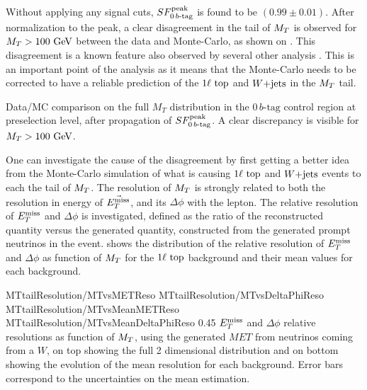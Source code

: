     Without applying any signal cuts, $SF_{0\, b\text{-tag}}^{\text{peak}}$ is found to be $(0.99 \pm 0.01)$.
    After normalization to the peak, a clear disagreement in the tail of $M_T$ is observed
    for $M_T > 100 ~\text{GeV}$ between the data and Monte-Carlo, as shown on
    . This disagreement is a known feature
    also observed by several other analysis \cite{WjetsDifferentialCrossSection, LeptonicMonotop,
    B2GttMET}. This is an important point of the analysis as
    it means that the Monte-Carlo needs to be corrected to have a reliable prediction of
    the $1\ell~\text{top}$ and $\text{$W$+jets}$ in the $M_T$ tail.

                 {Data/MC comparison on the full $M_T$ distribution in the $0\, b\text{-tag}$ control
                 region at preselection level, after propagation of $SF_{0\, b\text{-tag}}^{\text{peak}}$. A clear
                 discrepancy is visible for $M_T > 100 ~\text{GeV}$.}

    One can investigate the cause of the disagreement by first getting a better idea from
    the Monte-Carlo simulation of what is causing $1\ell~\text{top}$ and $\text{$W$+jets}$ events
    to each the tail of $M_T$. The resolution of $M_T$ is strongly related to both the
    resolution in energy of $\vec{E_T^\text{miss}}$, and its $\Delta\phi$ with the lepton. The relative
    resolution of $E_T^\text{miss}$ and $\Delta \phi$ is investigated, defined as the ratio of the
    reconstructed quantity versus the generated quantity, constructed from the generated
    prompt neutrinos in the event.  shows the distribution of the relative
    resolution of $E_T^\text{miss}$ and $\Delta \phi$ as function of $M_T$ for the $1\ell~\text{top}$
    background and their mean values for each background.

                      {MTtailResolution/MTvsMETReso}
                      {MTtailResolution/MTvsDeltaPhiReso}
                      {MTtailResolution/MTvsMeanMETReso}
                      {MTtailResolution/MTvsMeanDeltaPhiReso}
                      {0.45}
                      {$E_T^\text{miss}$ and $\Delta \phi$ relative resolutions as function of $M_T$,
                      using the generated $MET$ from neutrinos coming from a $W$, on top
                      showing the full 2 dimensional distribution and on bottom showing
                      the evolution of the mean resolution for each background. Error
                      bars correspond to the uncertainties on the mean estimation.}

